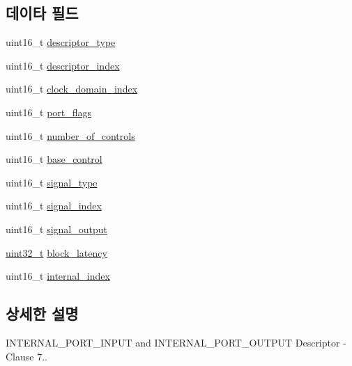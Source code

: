 \subsection*{데이타 필드}
\begin{DoxyCompactItemize}
\item 
uint16\+\_\+t \hyperlink{structjdksavdecc__descriptor__internal__port_ab7c32b6c7131c13d4ea3b7ee2f09b78d}{descriptor\+\_\+type}
\item 
uint16\+\_\+t \hyperlink{structjdksavdecc__descriptor__internal__port_a042bbc76d835b82d27c1932431ee38d4}{descriptor\+\_\+index}
\item 
uint16\+\_\+t \hyperlink{structjdksavdecc__descriptor__internal__port_a6608f023d147b556a49527d568abed8e}{clock\+\_\+domain\+\_\+index}
\item 
uint16\+\_\+t \hyperlink{structjdksavdecc__descriptor__internal__port_a60a1f1704542df3b3f6e6db56622ddd9}{port\+\_\+flags}
\item 
uint16\+\_\+t \hyperlink{structjdksavdecc__descriptor__internal__port_a0104bea638bdadf1a547c2b93813e22f}{number\+\_\+of\+\_\+controls}
\item 
uint16\+\_\+t \hyperlink{structjdksavdecc__descriptor__internal__port_af06eac7dd98377a85258308e8a25e7f2}{base\+\_\+control}
\item 
uint16\+\_\+t \hyperlink{structjdksavdecc__descriptor__internal__port_a248e60ef99d5ed1779989d1dd6b6dc5a}{signal\+\_\+type}
\item 
uint16\+\_\+t \hyperlink{structjdksavdecc__descriptor__internal__port_ae2e81a95ee9ad83f1fe22b6a1ee29075}{signal\+\_\+index}
\item 
uint16\+\_\+t \hyperlink{structjdksavdecc__descriptor__internal__port_ab4b91864e6fc335d7e86536d9f4461e4}{signal\+\_\+output}
\item 
\hyperlink{parse_8c_a6eb1e68cc391dd753bc8ce896dbb8315}{uint32\+\_\+t} \hyperlink{structjdksavdecc__descriptor__internal__port_ae2e9f0088d5e900b610d1b2818dfc559}{block\+\_\+latency}
\item 
uint16\+\_\+t \hyperlink{structjdksavdecc__descriptor__internal__port_a56a4632be255e3d3028e9978461c8ff4}{internal\+\_\+index}
\end{DoxyCompactItemize}


\subsection{상세한 설명}
I\+N\+T\+E\+R\+N\+A\+L\+\_\+\+P\+O\+R\+T\+\_\+\+I\+N\+P\+UT and I\+N\+T\+E\+R\+N\+A\+L\+\_\+\+P\+O\+R\+T\+\_\+\+O\+U\+T\+P\+UT Descriptor -\/ Clause 7.. 

